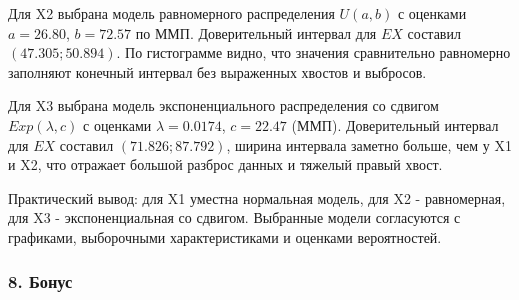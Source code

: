 \documentclass[11pt]{article}
\begin{document}
Для X2 выбрана модель равномерного распределения \(U(a, b)\) с оценками
\(a = 26.80\), \(b = 72.57\) по ММП. Доверительный интервал для \(EX\)
составил \((47.305; 50.894)\). По гистограмме видно, что значения
сравнительно равномерно заполняют конечный интервал без выраженных
хвостов и выбросов.

Для X3 выбрана модель экспоненциального распределения со сдвигом
\(Exp(\lambda, c)\) с оценками \(\lambda = 0.0174\), \(c = 22.47\)
(ММП). Доверительный интервал для \(EX\) составил \((71.826; 87.792)\),
ширина интервала заметно больше, чем у X1 и X2, что отражает большой
разброс данных и тяжелый правый хвост.

Практический вывод: для X1 уместна нормальная модель, для X2 -
равномерная, для X3 - экспоненциальная со сдвигом. Выбранные модели
согласуются с графиками, выборочными характеристиками и оценками
вероятностей.

    \subsubsection{8. Бонус}\label{ux431ux43eux43dux443ux441}
\end{document}
